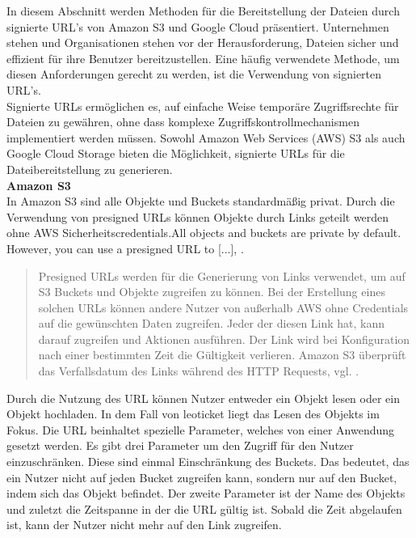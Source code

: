 In diesem Abschnitt werden Methoden für die Bereitstellung der Dateien durch signierte URL's von Amazon S3 und Google Cloud präsentiert. Unternehmen stehen und Organisationen stehen vor der Herausforderung, Dateien sicher und effizient für ihre Benutzer bereitzustellen. Eine häufig verwendete Methode, um diesen Anforderungen gerecht zu werden, ist die Verwendung von signierten URL's.\\

Signierte URLs ermöglichen es, auf einfache Weise temporäre Zugriffsrechte für Dateien zu gewähren, ohne dass komplexe Zugriffskontrollmechanismen implementiert werden müssen. Sowohl Amazon Web Services (AWS) S3 als auch Google Cloud Storage bieten die Möglichkeit, signierte URLs für die Dateibereitstellung zu generieren.\\

\textbf{Amazon S3}\\

In Amazon S3 sind alle Objekte und Buckets standardmäßig privat. Durch die Verwendung von presigned URLs können Objekte durch Links geteilt werden ohne AWS Sicherheitscredentials.\glqq All objects and buckets are private by default. However, you can use a presigned URL to [...]\grqq, \cite{aws-signed-urls}. 

\begin{quote}
	Presigned URLs werden für die Generierung von Links verwendet, um auf S3 Buckets und Objekte zugreifen zu können. Bei der Erstellung eines solchen URLs können andere Nutzer von außerhalb AWS ohne Credentials auf die gewünschten Daten zugreifen. Jeder der diesen Link hat, kann darauf zugreifen und Aktionen ausführen. Der Link wird bei Konfiguration nach einer bestimmten Zeit die Gültigkeit verlieren. Amazon S3 überprüft das Verfallsdatum des Links während des HTTP Requests, vgl. \cite{aws-signed-urls}. 
\end{quote}

Durch die Nutzung des URL können Nutzer entweder ein Objekt lesen oder ein Objekt hochladen. In dem Fall von leoticket liegt das Lesen des Objekts im Fokus. Die URL beinhaltet spezielle Parameter, welches von einer Anwendung gesetzt werden. Es gibt drei Parameter um den Zugriff für den Nutzer einzuschränken. Diese sind einmal Einschränkung des Buckets. Das bedeutet, das ein Nutzer nicht auf jeden Bucket zugreifen kann, sondern nur auf den Bucket, indem sich das Objekt befindet. Der zweite Parameter ist der Name des Objekts und zuletzt die Zeitspanne in der die URL gültig ist. Sobald die Zeit abgelaufen ist, kann der Nutzer nicht mehr auf den Link zugreifen.\\

